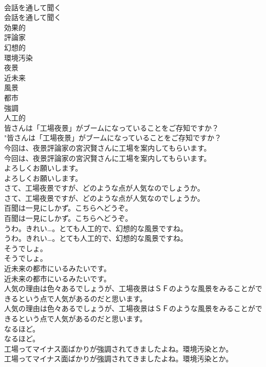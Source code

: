 \documentclass[8pt]{extreport}
\begin{document}
\begin{CJK}{UTF8}{min}
\\	会話を通して聞く
\\	会話を通して聞く
\\	効果的
\\	評論家
\\	幻想的
\\	環境汚染
\\	夜景
\\	近未来
\\	風景
\\	都市
\\	強調
\\	人工的
\\	皆さんは「工場夜景」がブームになっていることをご存知ですか？	
\\	"皆さんは「工場夜景」がブームになっていることをご存知ですか？ 
\\	今回は、夜景評論家の宮沢賢さんに工場を案内してもらいます。	
\\	今回は、夜景評論家の宮沢賢さんに工場を案内してもらいます。 
\\	よろしくお願いします。	
\\	よろしくお願いします。 
\\	さて、工場夜景ですが、どのような点が人気なのでしょうか。	
\\	さて、工場夜景ですが、どのような点が人気なのでしょうか。 
\\	百聞は一見にしかず。こちらへどうぞ。	
\\	百聞は一見にしかず。こちらへどうぞ。 
\\	うわ。きれい…。とても人工的で、幻想的な風景ですね。	
\\	うわ。きれい…。とても人工的で、幻想的な風景ですね。 
\\	そうでしょ。	
\\	そうでしょ。 
\\	近未来の都市にいるみたいです。	
\\	近未来の都市にいるみたいです。 
\\	人気の理由は色々あるでしょうが、工場夜景はＳＦのような風景をみることができるという点で人気があるのだと思います。	
\\	人気の理由は色々あるでしょうが、工場夜景はＳＦのような風景をみることができるという点で人気があるのだと思います。 
\\	なるほど。	
\\	なるほど。 
\\	工場ってマイナス面ばかりが強調されてきましたよね。環境汚染とか。	
\\	工場ってマイナス面ばかりが強調されてきましたよね。環境汚染とか。 

\end{CJK}
\end{document}
